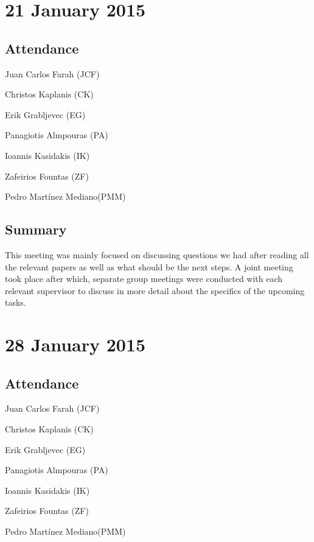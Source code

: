 \documentclass[a4paper,11pt]{article}
\begin{document}
\maketitle
\section*{21 January 2015}
\subsection*{Attendance}
\begin{compactenum}
\item Juan Carlos Farah (JCF)
\item Christos Kaplanis (CK)
\item Erik Grabljevec (EG)
\item Panagiotis Almpouras (PA)
\item Ioannis Kasidakis (IK)
\item Zafeirios Fountas (ZF)
\item Pedro Martínez Mediano(PMM)
\end{compactenum}

\subsection*{Summary}
This meeting was mainly focused on discussing questions we had after reading all the relevant papers as well as what should be the next steps. A joint meeting took place after which, separate group meetings were conducted with each relevant supervisor to discuss in more detail about the specifics of the upcoming tasks.

\maketitle
\section*{28 January 2015}
\subsection*{Attendance}
\begin{compactenum}
\item Juan Carlos Farah (JCF)
\item Christos Kaplanis (CK)
\item Erik Grabljevec (EG)
\item Panagiotis Almpouras (PA)
\item Ioannis Kasidakis (IK)
\item Zafeirios Fountas (ZF)
\item Pedro Martínez Mediano(PMM)
\end{compactenum}
\end{document}
